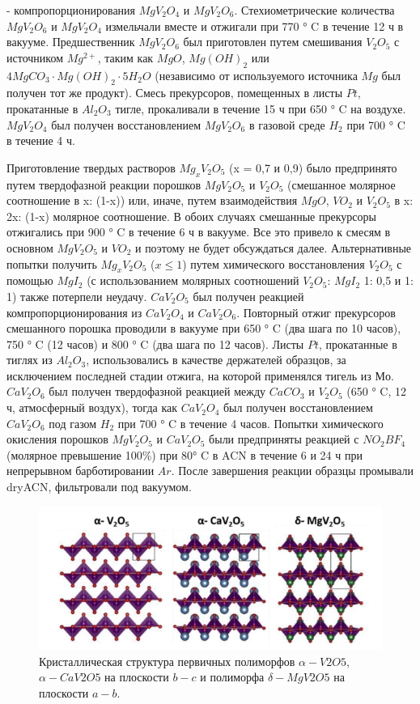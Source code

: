 \documentclass[11pt]{article}
\begin{document}
- компропорционирования $MgV_2O_4$ и $MgV_2O_6$. Стехиометрические количества $MgV_2O_6$ и $MgV_2O_4$ измельчали вместе и отжигали при 770 ° C в течение 12 ч в вакууме. Предшественник $MgV_2O_6$ был приготовлен путем смешивания $V_2O_5$ с источником $Mg^{2+}$, таким как $MgO$, $Mg(OH)_2$ или $4MgCO_3 · Mg (OH)_2 · 5H_2O$ (независимо от используемого источника $Mg$ был получен тот же продукт). Смесь прекурсоров, помещенных в листы $Pt$, прокатанные в $Al_2O_3$ тигле, прокаливали в течение 15 ч при 650 ° C на воздухе. $MgV_2O_4$ был получен восстановлением $MgV_2O_6$ в газовой среде $H_2$ при 700 ° C в течение 4 ч.

Приготовление твердых растворов $Mg_xV_2O_5$ (x = 0,7 и 0,9) было предпринято путем твердофазной реакции порошков $MgV_2O_5$ и $V_2O_5$ (смешанное молярное соотношение в x: (1-x)) или, иначе, путем взаимодействия $MgO$, $VO_2$ и $V_2O_5$ в x: 2x: (1-x) молярное соотношение. В обоих случаях смешанные прекурсоры отжигались при 900 ° C в течение 6 ч в вакууме. Все это привело к смесям в основном $MgV_2O_5$ и $VO_2$ и поэтому не будет обсуждаться далее. Альтернативные попытки получить $Mg_xV_2O_5$ ($x \le 1$) путем химического восстановления $V_2O_5$ с помощью $MgI_2$ (с использованием молярных соотношений $V_2O_5$: $MgI_2$ 1: 0,5 и 1: 1) также потерпели неудачу. $CaV_2O_5$ был получен реакцией компропорционирования из $CaV_2O_4$ и $CaV_2O_6$. Повторный отжиг прекурсоров смешанного порошка проводили в вакууме при 650 ° C (два шага по 10 часов), 750 ° C (12 часов) и 800 ° C (два шага по 12 часов). Листы $Pt$, прокатанные в тиглях из $Al_2O_3$, использовались в качестве держателей образцов, за исключением последней стадии отжига, на которой применялся тигель из $Мо$. $CaV_2O_6$ был получен твердофазной реакцией между $CaCO_3$ и $V_2O_5$ (650 ° C, 12 ч, атмосферный воздух), тогда как $CaV_2O_4$ был получен восстановлением $CaV_2O_6$ под газом $H_2$ при 700 ° C в течение 4 часов. Попытки химического окисления порошков $MgV_2O_5$ и $CaV_2O_5$ были предприняты реакцией с $NO_2BF_4$ (молярное превышение 100\%) при 80° C в ACN в течение 6 и 24 ч при непрерывном барботировании $Ar$. После завершения реакции образцы промывали dryACN, фильтровали под вакуумом.

\begin{figure}[htp]
\centering
\includegraphics[scale=0.7]{V_2O_5}
\caption{ Кристаллическая структура первичных полиморфов $\alpha-V2O5$, $\alpha-CaV2O5$ на плоскости $b-c$ и полиморфа $\delta-MgV2O5$ на плоскости $a-b$. ~\cite{verrelli2018}}
\label{}
\end{figure}
\end{document}
